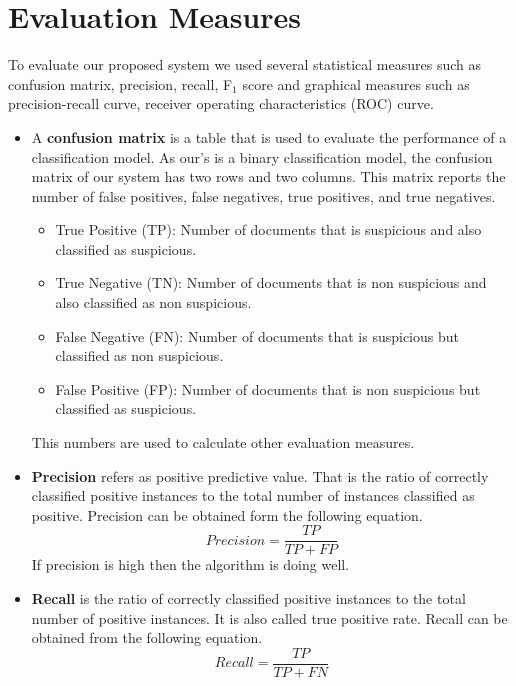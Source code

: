 \section{\textbf{Evaluation Measures}}
To evaluate our proposed system we used several statistical measures such as confusion matrix, precision, recall, F$_1$ score and graphical measures such as precision-recall curve, receiver operating characteristics (ROC) curve.

\begin{itemize}
\item {A \textbf{confusion matrix}} is a table that is used to evaluate the performance of a classification model. As our's is a binary classification model, the confusion matrix of our system has two rows and two columns. This matrix reports the number of false positives, false negatives, true positives, and true negatives.

\begin{itemize}
    \item True Positive (TP): Number of documents that is suspicious and also classified as suspicious.\vspace{0.2cm}
    \item True Negative (TN): Number of documents that is non suspicious and also classified as non suspicious.\vspace{0.2cm}
    \item False Negative (FN): Number of documents that is suspicious but classified as non suspicious.\vspace{0.2cm}
    \item False Positive (FP): Number of documents that is non suspicious but classified as suspicious. 
\end{itemize}

This numbers are used to calculate other evaluation measures.
\vspace{0.3cm}
\item{\textbf{Precision}} refers as positive predictive value. That is the ratio of correctly classified positive instances to the total number of instances classified as positive. Precision can be obtained form  the following equation.
\begin{equation}
    Precision = \frac{TP}{TP+FP}
\end{equation}
If precision is high then the algorithm is doing well.

\vspace{0.3cm}
\item{\textbf{Recall}} is the ratio of correctly classified positive instances to the total number of positive instances. It is also called true positive rate. Recall can be obtained from the following equation.
\begin{equation}
    Recall = \frac{TP}{TP+FN}
\end{equation}


\end{itemize}
